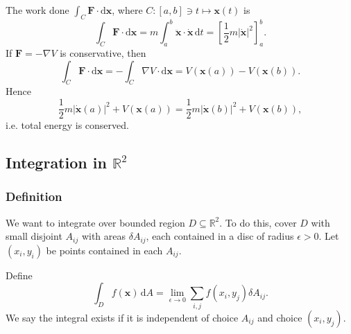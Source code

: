 \begin{example}
    The work done $ \int_{C} \mathbf{F} \cdot\mathrm{d}\mathbf{x} $, where $ C:[a,b]\ni t\mapsto \mathbf{x}(t) $ is 
    \[
        \int_{C} \mathbf{F} \cdot\mathrm{d}\mathbf{x}= m \int_{a}^{b} \ddot{\mathbf{x}}\cdot \dot{\mathbf{x}} \,\mathrm{d}t = \left[ \frac{1}{2}m |\dot{\mathbf{x}}|^2 \right]_{a}^{b}.
    \]
    If $\mathbf{F} = -\nabla V$ is conservative, then 
    \[
        \int_{C} \mathbf{F} \cdot\mathrm{d}\mathbf{x} = - \int_{C} \nabla V \cdot\mathrm{d}\mathbf{x} = V(\mathbf{x}(a))-V(\mathbf{x}(b)).
    \]
    Hence
    \[
        \frac{1}{2}m |\dot{\mathbf{x}}(a)|^2+V(\mathbf{x}(a))=\frac{1}{2}m |\dot{\mathbf{x}}(b)|^2+V(\mathbf{x}(b)),
    \]
    i.e. total energy is conserved.
\end{example}

\subsection{Integration in $ \mathbb{R}^{2} $}
\subsubsection*{Definition}
We want to integrate over bounded region $ D \subseteq \mathbb{R}^{2} $. To do this, cover $D$ with small disjoint $A_{ij}$ with areas $ \delta A_{ij} $, each contained in a disc of radius $ \epsilon>0 $. Let $ (x_i,y_i) $ be points contained in each $A_{ij}$.
\begin{center}
\end{center}

\begin{definition}
    Define 
    \[
        \int_{D} f(\mathbf{x}) \,\mathrm{d}A = \lim_{\epsilon \to 0} \sum_{i,j} f(x_i,y_j) \delta A_{ij}.
    \]
    We say the integral exists if it is independent of choice $A_{ij}$ and choice $ (x_i,y_j) $.
\end{definition}

